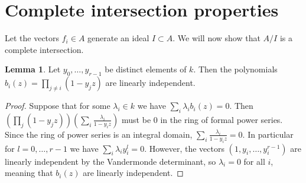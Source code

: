 \documentclass{amsart}
\numberwithin{equation}{section}
\theoremstyle{definition}
\newtheorem{lemma}[theorem]{Lemma}
\begin{document}
\section{Complete intersection properties}

Let the vectors $f_i \in A$ generate an ideal $I \subset A$.  We will now show that $A/I$ is a complete intersection.

\begin{lemma}\label{lem:vand}Let $y_0, \ldots, y_{r - 1}$ be distinct elements of $k$.  Then the polynomials $b_i(z) = \prod_{j \neq i} (1 - y_j z)$ are linearly independent.
\end{lemma}
\begin{proof} 
Suppose that for some $\lambda_i \in k$ we have $\sum_i \lambda_ib_i(z)=0$.  Then $\left(\prod_j (1-y_jz)\right)\left(\sum_i \frac{\lambda_i}{1-y_iz}\right)$ must be $0$ in the ring of formal power series. Since the ring of power series is an integral domain, $\sum_i \frac{\lambda_i}{1-y_iz}=0$. In particular for $l=0,\dots,r-1$ we have $\sum_i \lambda_iy_i^l=0$.  However, the vectors $(1,y_i,\dots,y_i^{r-1})$ are linearly independent by the Vandermonde determinant, so $\lambda_i=0$ for all $i$, meaning that $b_i(z)$ are linearly independent.
\end{proof}

\end{document}
